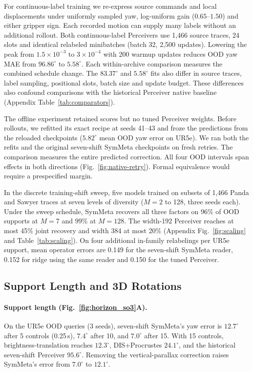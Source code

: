 \documentclass{article}
\theoremstyle{plain}
\theoremstyle{remark}
\begin{document}
For continuous-label training we re-express source commands and local displacements under uniformly sampled yaw, log-uniform gain ($0.65$--$1.50$) and either gripper sign. Each recorded motion can supply many labels without an additional rollout. Both continuous-label Perceivers use 1,466 source traces, 24 slots and identical relabeled minibatches (batch 32, 2,500 updates). Lowering the peak from $1.5\times10^{-3}$ to $3\times10^{-4}$ with 200 warmup updates reduces OOD yaw MAE from $96.86^\circ$ to $5.58^\circ$. Each within-archive comparison measures the combined schedule change. The $83.37^\circ$ and $5.58^\circ$ fits also differ in source traces, label sampling, positional slots, batch size and update budget. These differences also confound comparisons with the historical Perceiver native baseline (Appendix Table~\ref{tab:comparators}).

The offline experiment retained scores but no tuned Perceiver weights. Before rollouts, we refitted its exact recipe at seeds 41--43 and froze the predictions from the reloaded checkpoints ($5.82^\circ$ mean OOD yaw error on UR5e). We ran both the refits and the original seven-shift SymMeta checkpoints on fresh retries. The comparison measures the entire predicted correction. All four OOD intervals span effects in both directions (Fig.~\ref{fig:native-retry}). Formal equivalence would require a prespecified margin.

In the discrete training-shift sweep, five models trained on subsets of 1,466 Panda and Sawyer traces at seven levels of diversity ($M{=}2$ to 128, three seeds each). Under the sweep schedule, SymMeta recovers all three factors on 96\% of OOD supports at $M{=}7$ and 99\% at $M{=}128$. The width-192 Perceiver reaches at most 45\% joint recovery and width 384 at most 20\% (Appendix Fig.~\ref{fig:scaling} and Table~\ref{tab:scaling}). On four additional in-family relabelings per UR5e support, mean operator errors are 0.149 for the seven-shift SymMeta reader, 0.152 for ridge using the same reader and 0.150 for the tuned Perceiver.

\subsection{Support Length and 3D Rotations}

\paragraph{Support length (Fig.~\ref{fig:horizon_so3}A).}
On the UR5e OOD queries (3 seeds), seven-shift SymMeta's yaw error is $12.7^\circ$ after 5 controls (0.25\,s), $7.4^\circ$ after 10, and $7.0^\circ$ after 15. With 15 controls, brightness-translation reaches $12.3^\circ$, DIS+Procrustes $24.1^\circ$, and the historical seven-shift Perceiver $95.6^\circ$. Removing the vertical-parallax correction raises SymMeta's error from $7.0^\circ$ to $12.1^\circ$.
\end{document}
